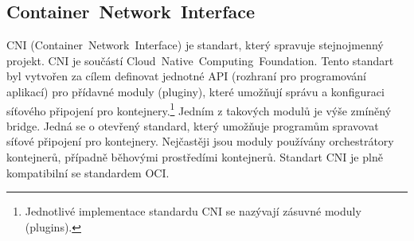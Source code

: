 \subsection{Container~Network~Interface}
CNI (Container~Network~Interface) je standart, který spravuje stejnojmenný projekt. CNI je součástí Cloud~Native~Computing~Foundation. Tento standart byl vytvořen za cílem definovat jednotné API (rozhraní pro programování aplikací) pro přídavné moduly (pluginy), které umožňují správu a konfiguraci síťového připojení pro kontejnery.\footnote{Jednotlivé implementace standardu CNI se nazývají zásuvné moduly (plugins).} Jedním z takových modulů je výše zmíněný bridge. Jedná se o otevřený standard, který umožňuje programům spravovat síťové připojení pro kontejnery. Nejčastěji jsou moduly používány orchestrátory kontejnerů, případně běhovými prostředími kontejnerů. Standart CNI je plně kompatibilní se standardem OCI.


